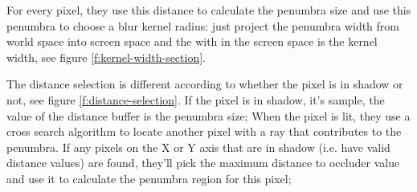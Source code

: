 For every pixel, they use this distance to calculate the penumbra size and use this penumbra to choose a blur kernel radius: just project the penumbra width from world space into screen space and the with in the screen space is the kernel width, see figure \ref{f:kernel-width-section}.

The distance selection is different according to whether the pixel is in shadow or not, see figure \ref{f:distance-selection}. If the pixel is in shadow, it's sample, the value of the  distance buffer is the penumbra size; When the pixel is lit, they use a cross search algorithm to locate another pixel with a ray that contributes to the penumbra. If any pixels on the X or Y axis that are in shadow (i.e. have valid distance values) are found, they'll pick the maximum distance to occluder value and use it to calculate the penumbra region for this pixel; 

